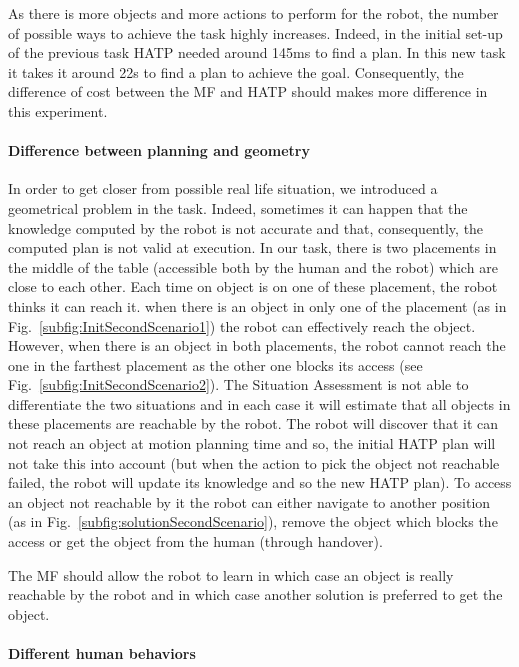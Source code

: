 \documentclass[english,a4paper,11pt,twoside]{StyleThese}
\begin{document}
As there is more objects and more actions to perform for the robot, the number of possible ways to achieve the task highly increases. Indeed, in the initial set-up of the previous task HATP needed around 145ms to find a plan. In this new task it takes it around 22s to find a plan to achieve the goal. Consequently, the difference of cost between the MF and HATP should makes more difference in this experiment.

\paragraph{Difference between planning and geometry}

In order to get closer from possible real life situation, we introduced a geometrical problem in the task. Indeed, sometimes it can happen that the knowledge computed by the robot is not accurate and that, consequently, the computed plan is not valid at execution. In our task, there is two placements in the middle of the table (accessible both by the human and the robot) which are close to each other. Each time on object is on one of these placement, the robot thinks it can reach it. when there is an object in only one of the placement (as in Fig.~\ref{subfig:InitSecondScenario1}) the robot can effectively reach the object. However, when there is an object in both placements, the robot cannot reach the one in the farthest placement as the other one blocks its access (see Fig.~\ref{subfig:InitSecondScenario2}). The Situation Assessment is not able to differentiate the two situations and in each case it will estimate that all objects in these placements are reachable by the robot. The robot will discover that it can not reach an object at motion planning time and so, the initial HATP plan will not take this into account (but when the action to pick the object not reachable failed, the robot will update its knowledge and so the new HATP plan). To access an object not reachable by it the robot can either navigate to another position (as in Fig.~\ref{subfig:solutionSecondScenario}), remove the object which blocks the access or get the object from the human (through handover).

The MF should allow the robot to learn in which case an object is really reachable by the robot and in which case another solution is preferred to get the object.

\paragraph{Different human behaviors}
\end{document}
